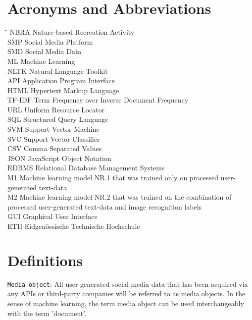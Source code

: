 
\section*{Acronyms and Abbreviations}
\begin{tabbing}
 \hspace*{1.6cm}  \= \kill
 NBRA \> Nature-based Recreation Activity \\[0.5ex]
 SMP \> Social Media Platform \\
 SMD \> Social Media Data \\
 ML \> Machine Learning \\
 NLTK \> Natural Language Toolkit \\
 API \> Application Program Interface \\
 HTML \> Hypertext Markup Language \\
 TF-IDF \> Term Frequency over Inverse Document Frequency \\
 URL \> Uniform Resource Locator \\
 SQL \> Structured Query Language \\
 SVM \> Support Vector Machine \\
 SVC \> Support Vector Classifier \\
 CSV \> Comma Separated Values \\
 JSON \> JavaScript Object Notation \\
 RDBMS \> Relational Database Management Systems \\
 M1 \> Machine learning model NR.1 that was trained only on processed user-generated text-data \\
 M2 \> Machine learning model NR.2 that was trained on the combination of processed user-generated text-data and image recognition labels \\
 GUI \> Graphical User Interface \\
 ETH \> Eidgen\"{o}ssische Technische Hochschule
\end{tabbing}

\section*{Definitions} \label{definitions}
\texttt{Media object}: All user generated social media data that has been acquired via any APIs or third-party companies will be referred to as media objects. In the sense of machine learning, the term media object can be used interchangeably with the term 'document'.
\newline

